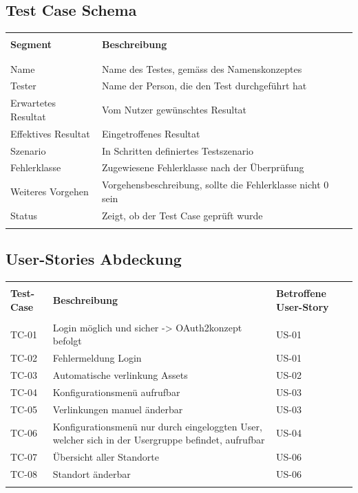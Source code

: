 \subsection{Test Case Schema}
\begin{table}[H]
  \begin{tabularx}{\textwidth}{l l X}\hline \\
  \textbf{Segment} & \textbf{Beschreibung} \\ \\\hline \\
  Name & Name des Testes, gemäss des Namenskonzeptes \\
  Tester & Name der Person, die den Test durchgeführt hat \\
  Erwartetes Resultat & Vom Nutzer gewünschtes Resultat \\
  Effektives Resultat & Eingetroffenes Resultat \\
  Szenario & In Schritten definiertes Testszenario \\
  Fehlerklasse & Zugewiesene Fehlerklasse nach der Überprüfung \\
  Weiteres Vorgehen & Vorgehensbeschreibung, sollte die Fehlerklasse nicht 0 sein \\
  Status & Zeigt, ob der Test Case geprüft wurde \\
  \\\hline
  \end{tabularx}
\end{table}
\subsection{User-Stories Abdeckung}
\begin{table}[H]
  \begin{tabularx}{\textwidth}{l X l}\hline \\
  \textbf{Test-Case} & \textbf{Beschreibung} & \textbf{Betroffene User-Story} \\\hline \\
  TC-01 & Login möglich und sicher -> OAuth2konzept befolgt & US-01 \\
  TC-02 & Fehlermeldung Login & US-01 \\
  TC-03 & Automatische verlinkung Assets & US-02 \\
  TC-04 & Konfigurationsmenü aufrufbar & US-03 \\
  TC-05 & Verlinkungen manuel änderbar & US-03 \\
  TC-06 & Konfigurationsmenü nur durch eingeloggten User, welcher sich in der Usergruppe befindet, aufrufbar & US-04 \\
  TC-07 & Übersicht aller Standorte & US-06 \\
  TC-08 & Standort änderbar & US-06 \\
  \\\hline
  \end{tabularx}
\end{table}